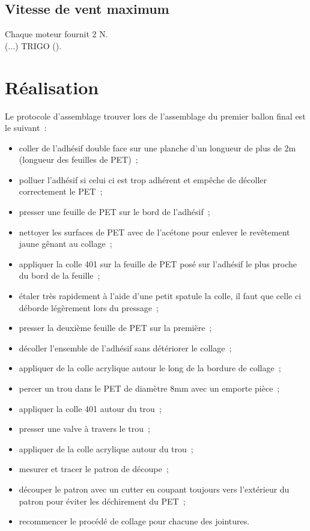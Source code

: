 \documentclass[a4paper,11pt]{article}
\begin{document}
\subsection{Vitesse de vent maximum}
	Chaque moteur fournit 2 N.\\
	(...) TRIGO ().
\section{Réalisation}

Le protocole d'assemblage trouver lors de l'assemblage du premier ballon final est le suivant~:
\begin{itemize}
 \item coller de l'adhésif double face sur une planche d'un longueur de plus de 2m (longueur des feuilles de PET)~;
 \item polluer l'adhésif si celui ci est trop adhérent et empêche de décoller correctement le PET~;
 \item presser une feuille de PET sur le bord de l'adhésif~;
 \item nettoyer les surfaces de PET avec de l'acétone pour enlever le revêtement jaune gênant au collage~;
 \item appliquer la colle 401 sur la feuille de PET posé sur l'adhésif le plus proche du bord de la feuille~;
 \item étaler très rapidement à l'aide d'une petit spatule la colle, il faut que celle ci déborde légèrement lors du pressage~;
 \item presser la deuxième feuille de PET sur la première~;
 \item décoller l'ensemble de l'adhésif sans détériorer le collage~;
 \item appliquer de la colle acrylique autour le long de la bordure de collage~;
 \item percer un trou dans le PET de diamètre 8mm avec un emporte pièce~;
 \item appliquer la colle 401 autour du trou~;
 \item presser une valve à travers le trou~;
 \item appliquer de la colle acrylique autour du trou~;
 \item mesurer et tracer le patron de découpe~;
 \item découper le patron avec un cutter en coupant toujours vers l'extérieur du patron pour éviter les déchirement du PET~;
 \item recommencer le procédé de collage pour chacune des jointures.
\end{itemize}
\end{document}

